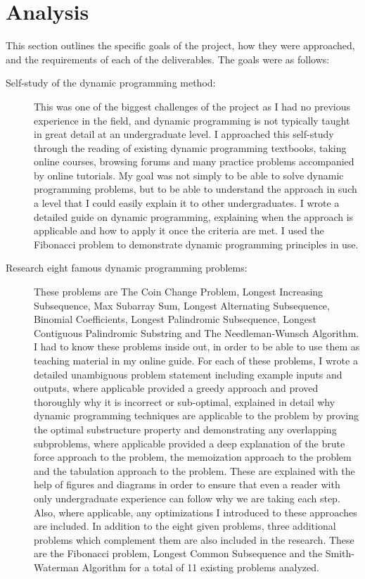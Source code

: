 \chapter{Analysis}
This section outlines the specific goals of the project, how they were approached, and the requirements of each of the deliverables.
The goals were as follows:
\begin{description}
    \item[Self-study of the dynamic programming method:]
    This was one of the biggest challenges of the project as I had no previous experience in the field, and dynamic programming is not typically taught in great detail at an undergraduate level.
    I approached this self-study through the reading of existing dynamic programming textbooks, taking online courses, browsing forums and many practice problems accompanied by online tutorials.
    My goal was not simply to be able to solve dynamic programming problems, but to be able to understand the approach in such a level that I could easily explain it to other undergraduates.
    I wrote a detailed guide on dynamic programming, explaining when the approach is applicable and how to apply it once the criteria are met.
    I used the Fibonacci problem to demonstrate dynamic programming principles in use.
        
    \item[Research eight famous dynamic programming problems:]
    These problems are The Coin Change Problem, Longest Increasing Subsequence, Max Subarray Sum, Longest Alternating Subsequence, Binomial Coefficients, Longest Palindromic Subsequence, Longest Contiguous Palindromic Substring and The Needleman-Wunsch Algorithm.
    I had to know these problems inside out, in order to be able to use them as teaching material in my online guide.
    For each of these problems, I wrote a detailed unambiguous problem statement including example inputs and outputs,
    where applicable provided a greedy approach and proved thoroughly why it is incorrect or sub-optimal,
    explained in detail why dynamic programming techniques are applicable to the problem by proving the optimal substructure property and demonstrating any overlapping subproblems,
    where applicable provided a deep explanation of the brute force approach to the problem,
    the memoization approach to the problem and the tabulation approach to the problem.
    These are explained with the help of figures and diagrams in order to ensure that even a reader with only undergraduate experience can follow why we are taking each step.
    Also, where applicable, any optimizations I introduced to these approaches are included.
    In addition to the eight given problems, three additional problems which complement them are also included in the research. These are the Fibonacci problem, Longest Common Subsequence and the Smith-Waterman Algorithm for a total of 11 existing problems analyzed.
     

\end{description}
